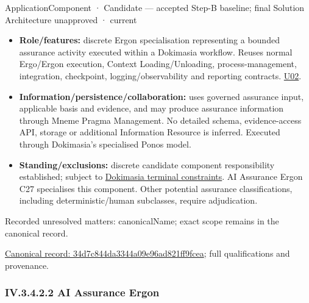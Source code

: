 \label{element:34d7c844da3344a09e96ad821ff9fcea}
{\small ApplicationComponent · Candidate — accepted Step-B baseline; final Solution Architecture unapproved · current}\par

\begin{itemize}


\item \textbf{Role/features:} discrete Ergon specialisation representing a bounded assurance
  activity executed within a Dokimasia workflow. Reuses normal Ergo/Ergon
  execution, Context Loading/Unloading, process-management, integration,
  checkpoint, logging/observability and reporting contracts. \href{\detokenize{../../../../../docs/markdown/05-information-systems-architecture/sources.md#u02}}{U02}.

\item \textbf{Information/persistence/collaboration:} uses governed assurance input,
  applicable basis and evidence, and may produce assurance information through
  Mneme Pragma Management. No detailed schema, evidence-access API, storage or
  additional Information Resource is inferred. Executed through Dokimasia's
  specialised Ponos model.

\item \textbf{Standing/exclusions:} discrete candidate component responsibility established;
  subject to \href{\detokenize{../../../../../docs/markdown/05-information-systems-architecture/component-register.md#dokimasia-terminal-boundaries}}{Dokimasia terminal constraints}.
  AI Assurance Ergon C27 specialises this component. Other potential assurance
  classifications, including deterministic/human subclasses, require adjudication.

\end{itemize}

{\small Recorded unresolved matters: canonicalName; exact scope remains in the canonical record.}\par
{\footnotesize \href{../../../../continuum/application/application-component/34d7c844da3344a09e96ad821ff9fcea.md}{Canonical record: 34d7c844da3344a09e96ad821ff9fcea}; full qualifications and provenance.}\par
\subsubsection*{IV.3.4.2.2 AI Assurance Ergon}
\label{navigation:IV.3.4.2.2}

